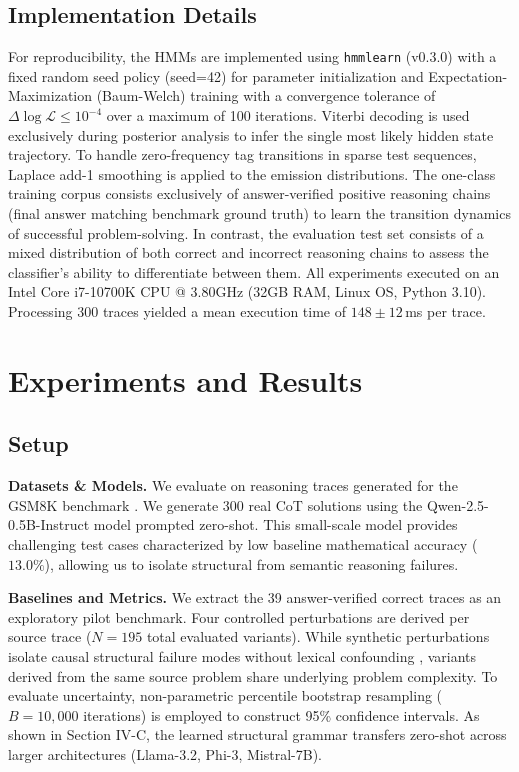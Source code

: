 \documentclass[conference]{IEEEtran}
\begin{document}
\subsection{Implementation Details}
For reproducibility, the HMMs are implemented using \texttt{hmmlearn} (v0.3.0) with a fixed random seed policy (seed=42) for parameter initialization and Expectation-Maximization (Baum-Welch) training with a convergence tolerance of $\Delta \log \mathcal{L} \le 10^{-4}$ over a maximum of 100 iterations. Viterbi decoding is used exclusively during posterior analysis to infer the single most likely hidden state trajectory. To handle zero-frequency tag transitions in sparse test sequences, Laplace add-1 smoothing is applied to the emission distributions. The one-class training corpus consists exclusively of answer-verified positive reasoning chains (final answer matching benchmark ground truth) to learn the transition dynamics of successful problem-solving. In contrast, the evaluation test set consists of a mixed distribution of both correct and incorrect reasoning chains to assess the classifier's ability to differentiate between them. All experiments executed on an Intel Core i7-10700K CPU @ 3.80GHz (32GB RAM, Linux OS, Python 3.10). Processing 300 traces yielded a mean execution time of $148 \pm 12$\,ms per trace.

\section{Experiments and Results}

\subsection{Setup}

\textbf{Datasets \& Models.} We evaluate on reasoning traces generated for the GSM8K benchmark \cite{cobbe2021training}. We generate 300 real CoT solutions using the Qwen-2.5-0.5B-Instruct model prompted zero-shot. This small-scale model provides challenging test cases characterized by low baseline mathematical accuracy ($13.0\%$), allowing us to isolate structural from semantic reasoning failures.

\textbf{Baselines and Metrics.} We extract the 39 answer-verified correct traces as an exploratory pilot benchmark. Four controlled perturbations are derived per source trace ($N=195$ total evaluated variants). While synthetic perturbations isolate causal structural failure modes without lexical confounding \cite{golovneva2023roscoe}, variants derived from the same source problem share underlying problem complexity. To evaluate uncertainty, non-parametric percentile bootstrap resampling ($B=10{,}000$ iterations) is employed to construct 95\% confidence intervals. As shown in Section IV-C, the learned structural grammar transfers zero-shot across larger architectures (Llama-3.2, Phi-3, Mistral-7B).
\end{document}
